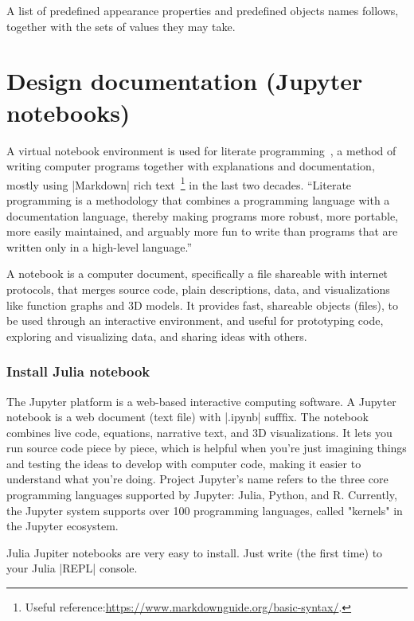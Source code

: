\begin{coding}
A list of predefined appearance properties and predefined objects names follows, together with the sets of values they may take. 
 

\section{Design documentation (Jupyter notebooks)}\label{sect:4-5}

A virtual notebook environment is used for literate programming~\cite{10.1093.27.2.97}, a method of writing computer programs together with explanations and documentation, mostly using |Markdown| rich text~\footnote{Useful reference:\href{https://www.markdownguide.org/basic-syntax/}{https://www.markdownguide.org/basic-syntax/}.} in the last two decades. “Literate programming is a methodology that combines a programming language with a documentation language, thereby making programs more robust, more portable, more easily maintained, and arguably more fun to write than programs that are written only in a high-level language.”~\cite{Knuth:92}


A notebook is a computer document, specifically a file shareable with internet protocols, that merges source code, plain descriptions, data, and visualizations like function graphs and 3D models. It provides fast, shareable objects (files), to be used through an interactive environment, and useful for prototyping code, exploring and visualizing data, and sharing ideas with others.

\subsubsection*{Install Julia notebook}\label{sect:4-5-1}


The Jupyter platform is a web-based interactive computing software. 
A Jupyter notebook is a web document (text file) with |.ipynb| sufffix.
The notebook combines live code, equations, narrative text, and 3D visualizations. It lets you run source code piece by piece, which is helpful when you're just imagining things and testing the ideas to develop with computer code, making it easier to understand what you're doing.
Project Jupyter's name refers to the three core programming languages supported by Jupyter: Julia, Python, and R. Currently, the Jupyter system supports over 100 programming languages, called "kernels" in the Jupyter ecosystem.

Julia Jupiter notebooks are very easy to install. 
Just write (the first time) to your Julia |REPL| console. 


\end{coding}
